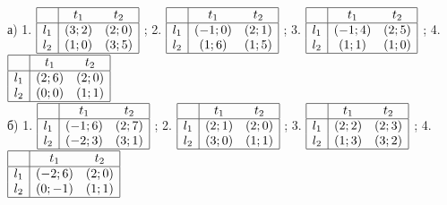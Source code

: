 {а)	1.  $\begin{array}{|c|cc|}  \hline {} & {t_{1} } & {t_{2} } \\  \hline {l_{1} } & {\left(3;2\right)} & {\left(2;0\right)} \\ {l_{2} } & {\left(1;0\right)} & {\left(3;5\right)} \\  \hline  \end{array}$ ; 2.  $\begin{array}{|c|cc|}  \hline {} & {t_{1} } & {t_{2} } \\  \hline {l_{1} } & {\left(-1;0\right)} & {\left(2;1\right)} \\ {l_{2} } & {\left(1;6\right)} & {\left(1;5\right)} \\  \hline  \end{array}$ ; 3.  $\begin{array}{|c|cc|}  \hline {} & {t_{1} } & {t_{2} } \\  \hline {l_{1} } & {\left(-1;4\right)} & {\left(2;5\right)} \\ {l_{2} } & {\left(1;1\right)} & {\left(1;0\right)} \\  \hline  \end{array}$ ; 4.  $\begin{array}{|c|cc|}  \hline {} & {t_{1} } & {t_{2} } \\  \hline {l_{1} } & {\left(2;6\right)} & {\left(2;0\right)} \\ {l_{2} } & {\left(0;0\right)} & {\left(1;1\right)} \\  \hline  \end{array}$ \\
б)	1.  $\begin{array}{|c|cc|}  \hline {} & {t_{1} } & {t_{2} } \\  \hline {l_{1} } & {\left(-1;6\right)} & {\left(2;7\right)} \\ {l_{2} } & {\left(-2;3\right)} & {\left(3;1\right)} \\  \hline  \end{array}$ ; 2.  $\begin{array}{|c|cc|}  \hline {} & {t_{1} } & {t_{2} } \\  \hline {l_{1} } & {\left(2;1\right)} & {\left(2;0\right)} \\ {l_{2} } & {\left(3;0\right)} & {\left(1;1\right)} \\  \hline  \end{array}$ ; 3.  $\begin{array}{|c|cc|}  \hline {} & {t_{1} } & {t_{2} } \\  \hline {l_{1} } & {\left(2;2\right)} & {\left(2;3\right)} \\ {l_{2} } & {\left(1;3\right)} & {\left(3;2\right)} \\  \hline  \end{array}$ ; 4.  $\begin{array}{|c|cc|}  \hline {} & {t_{1} } & {t_{2} } \\  \hline {l_{1} } & {\left(-2;6\right)} & {\left(2;0\right)} \\ {l_{2} } & {\left(0;-1\right)} & {\left(1;1\right)} \\  \hline  \end{array}$ \\
}
